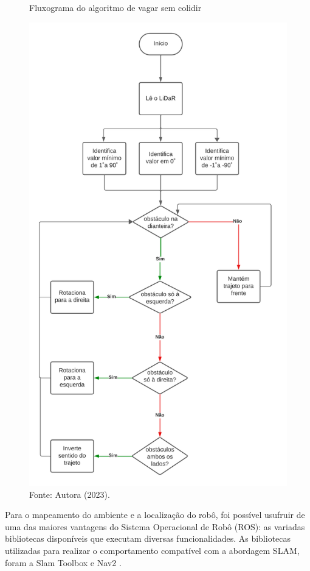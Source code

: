 \begin{figure}[h]
    \centering
    \caption{Fluxograma do algoritmo de vagar sem colidir}
    \includegraphics[scale=0.5]{fluxogramaEvitarObstaculos.png}
    
    \caption*{Fonte: Autora (2023).}
    \label{fig:fluxogramaEvitarObstaculos}
\end{figure}

Para o mapeamento do ambiente e a localização do robô, foi possível usufruir de uma das maiores vantagens do Sistema Operacional de Robô (ROS): as variadas bibliotecas disponíveis que executam diversas funcionalidades. As bibliotecas utilizadas para realizar o comportamento compatível com a abordagem SLAM, foram a  Slam Toolbox  e Nav2 \cite{nav2, slamtoolbox}.

